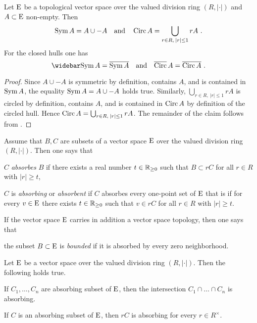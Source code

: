 \begin{lemma}
  Let $\mathrm{E}$ be a topological vector space over the valued division ring $(R,|\cdot|)$
  and $A \subset \mathrm{E}$ non-empty. Then
  \[
    \symHull A = A \cup -A  \quad \text{and} \quad \circHull A = \bigcup_{r\in R, \: |r|\leq 1} r A \ .
  \]
  For the closed hulls one has  
  \[
    \clsymHull A = \overline{\symHull A} \quad \text{and} \quad \clcircHull A = \overline{\circHull A} \ .
  \]
\end{lemma}

\begin{proof}
  Since $A \cup -A$ is symmetric by definition, contains $A$, and is contained in
  $\operatorname{Sym} A$, the equality $\operatorname{Sym} A = A \cup -A$ holds true.
  Similarly, $\bigcup_{r\in R, \: |r|\leq 1} r A$ is circled by definition, contains $A$, and is contained
  in $\operatorname{Circ} A$ by definition of the circled hull. Hence $ \operatorname{Circ} A = \bigcup_{r\in R, \: |r|\leq 1} r A $.
  The remainder of the claim follows from .
\end{proof}

\begin{definition}
  Assume that $B,C$ are subsets of a vector space $\mathrm{E}$ over the valued division ring
  $(R,|\cdot|)$. Then one says that 
  \begin{romanlist}
  \item
   $C$  \emph{absorbes} $B$ if  there exists a real number $t \in \mathbb{R}_{\geq 0}$ 
   such that $B \subset rC$ for all $r\in R$ with $|r| \geq t$,
  \item
   $C$ is  \emph{absorbing} or \emph{absorbent} 
   if $C$ absorbes every one-point set of $\mathrm{E}$ that is if for every 
   $v\in \mathrm{E}$ there exists $t \in \mathbb{R}_{\geq 0}$ such that 
   $v \in rC$ for all $r\in R$ with $|r| \geq t$.
 \end{romanlist}
 
  If the vector space $\mathrm{E}$ carries in addition a vector space topology, then one says that
  \begin{romanlist}
  \setcounter{enumi}{2}  
  \item
    the subset $B \subset \mathrm{E}$ is \emph{bounded} if it is absorbed by
    every zero neighborhood. 
  \end{romanlist}
\end{definition}

\begin{lemma}\label{thm:intersection-scalar-multiples-absorbing-sets-absorbing}
  Let $\mathrm{E}$ be a vector space over the valued division
  ring $(R,|\cdot|)$. Then the following holds true.
  \begin{romanlist}
  \item\label{ite:intersection-absorbing-sets-absorbing}
    If $C_1,\ldots,C_n$ are absorbing subset of $\mathrm{E}$, then the intersection
    $C_1\cap\ldots \cap C_n$ is absorbing.
  \item\label{ite:scalar-multiple-absorbing-set-absorbing}
    If $C$ is an absorbing subset of $\mathrm{E}$, then $rC$ is absorbing for every
    $r\in R^\times$.
  \end{romanlist} 
\end{lemma}

